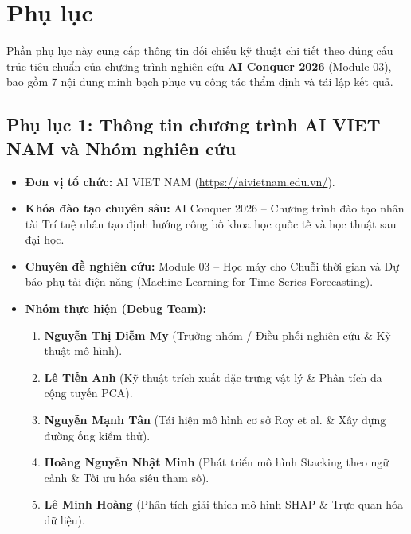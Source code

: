 \section*{Phụ lục}
\label{sec:appendix}

Phần phụ lục này cung cấp thông tin đối chiếu kỹ thuật chi tiết theo đúng cấu trúc tiêu chuẩn của chương trình nghiên cứu \textbf{AI Conquer 2026} (Module 03), bao gồm 7 nội dung minh bạch phục vụ công tác thẩm định và tái lập kết quả.

\subsection*{Phụ lục 1: Thông tin chương trình AI VIET NAM và Nhóm nghiên cứu}
\label{subsec:appendix_aivietnam}

\begin{itemize}
    \item \textbf{Đơn vị tổ chức:} AI VIET NAM (\url{https://aivietnam.edu.vn/}).
    \item \textbf{Khóa đào tạo chuyên sâu:} AI Conquer 2026 -- Chương trình đào tạo nhân tài Trí tuệ nhân tạo định hướng công bố khoa học quốc tế và học thuật sau đại học.
    \item \textbf{Chuyên đề nghiên cứu:} Module 03 -- Học máy cho Chuỗi thời gian và Dự báo phụ tải điện năng (Machine Learning for Time Series Forecasting).
    \item \textbf{Nhóm thực hiện (Debug Team):}
    \begin{enumerate}
        \item \textbf{Nguyễn Thị Diễm My} (Trưởng nhóm / Điều phối nghiên cứu \& Kỹ thuật mô hình).
        \item \textbf{Lê Tiến Anh} (Kỹ thuật trích xuất đặc trưng vật lý \& Phân tích đa cộng tuyến PCA).
        \item \textbf{Nguyễn Mạnh Tân} (Tái hiện mô hình cơ sở Roy et al. \& Xây dựng đường ống kiểm thử).
        \item \textbf{Hoàng Nguyễn Nhật Minh} (Phát triển mô hình Stacking theo ngữ cảnh \& Tối ưu hóa siêu tham số).
        \item \textbf{Lê Minh Hoàng} (Phân tích giải thích mô hình SHAP \& Trực quan hóa dữ liệu).
    \end{enumerate}
\end{itemize}

